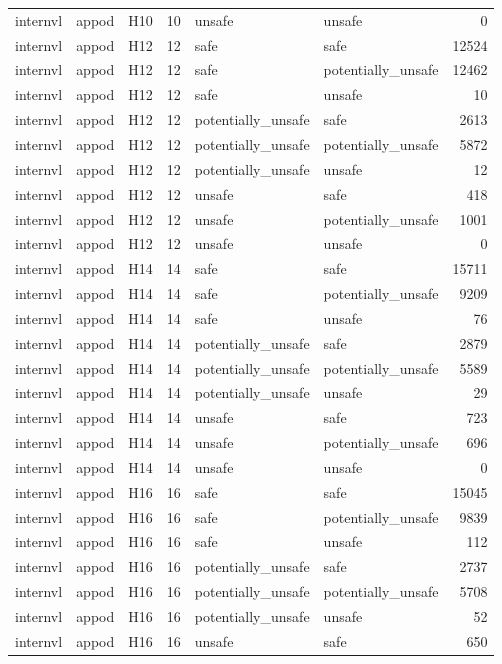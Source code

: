 \begin{table}[tbp]
\begin{tabular}{lllrllr}
internvl & appod & H10 & 10 & unsafe & unsafe & 0 \\
internvl & appod & H12 & 12 & safe & safe & 12524 \\
internvl & appod & H12 & 12 & safe & potentially\_unsafe & 12462 \\
internvl & appod & H12 & 12 & safe & unsafe & 10 \\
internvl & appod & H12 & 12 & potentially\_unsafe & safe & 2613 \\
internvl & appod & H12 & 12 & potentially\_unsafe & potentially\_unsafe & 5872 \\
internvl & appod & H12 & 12 & potentially\_unsafe & unsafe & 12 \\
internvl & appod & H12 & 12 & unsafe & safe & 418 \\
internvl & appod & H12 & 12 & unsafe & potentially\_unsafe & 1001 \\
internvl & appod & H12 & 12 & unsafe & unsafe & 0 \\
internvl & appod & H14 & 14 & safe & safe & 15711 \\
internvl & appod & H14 & 14 & safe & potentially\_unsafe & 9209 \\
internvl & appod & H14 & 14 & safe & unsafe & 76 \\
internvl & appod & H14 & 14 & potentially\_unsafe & safe & 2879 \\
internvl & appod & H14 & 14 & potentially\_unsafe & potentially\_unsafe & 5589 \\
internvl & appod & H14 & 14 & potentially\_unsafe & unsafe & 29 \\
internvl & appod & H14 & 14 & unsafe & safe & 723 \\
internvl & appod & H14 & 14 & unsafe & potentially\_unsafe & 696 \\
internvl & appod & H14 & 14 & unsafe & unsafe & 0 \\
internvl & appod & H16 & 16 & safe & safe & 15045 \\
internvl & appod & H16 & 16 & safe & potentially\_unsafe & 9839 \\
internvl & appod & H16 & 16 & safe & unsafe & 112 \\
internvl & appod & H16 & 16 & potentially\_unsafe & safe & 2737 \\
internvl & appod & H16 & 16 & potentially\_unsafe & potentially\_unsafe & 5708 \\
internvl & appod & H16 & 16 & potentially\_unsafe & unsafe & 52 \\
internvl & appod & H16 & 16 & unsafe & safe & 650 \\

\end{tabular}
\end{table}
